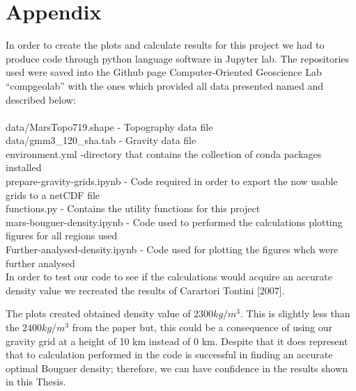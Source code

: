 \chapter{Appendix}

In order to create the plots and calculate results for this project we had to produce code through python language software in Jupyter lab. The repositories used were saved into the Github page Computer-Oriented Geoscience Lab ``compgeolab'' with the ones which provided all data presented named and described below:
\\ \footnotesize
\\
data/MarsTopo719.shape - Topography data file \\
data/gmm3\_120\_sha.tab - Gravity data file\\
environment.yml -directory that contains the collection of conda packages installed \\
prepare-gravity-grids.ipynb - Code required in order to export the now usable grids to a netCDF file \\
functions.py - Contains the utility functions for this project \\
mars-bouguer-density.ipynb - Code used to performed the calculations plotting figures for all regions used \\
Further-analysed-density.ipynb - Code used for plotting the figures whch were further analysed \\

\normalsize In order to test our code to see if the calculations would acquire an accurate density value we recreated the results of Carartori Tontini [2007]. 
\begin{figure}[H]
	\centering
\end{figure}
The plots created obtained density value of $2300 kg/m^3$. This is slightly less than the $2400 kg/m^3$ from the paper but, this could be a consequence of using our gravity grid at a height of 10 km instead of 0 km. Despite that it does represent that to calculation performed in the code is successful in finding an accurate optimal Bouguer density; therefore, we can have confidence in the results shown in this Thesis.
